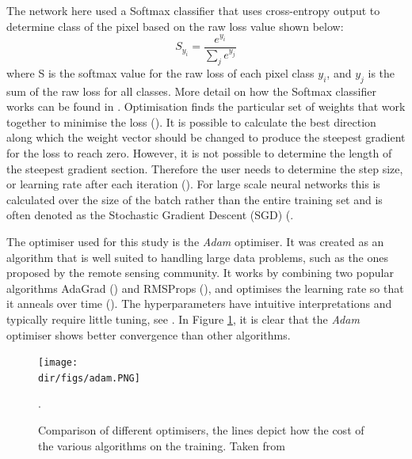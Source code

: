The network here used a Softmax classifier that uses cross-entropy output to determine class of the pixel based on the raw loss value shown below:
\[S_{y_i} = \frac{e^{y_i}}{\sum_j e^{y_j}}\]
where S is the softmax value for the raw loss of each pixel class $y_i$, and $y_j$ is the sum of the raw loss for all classes.
More detail on how the Softmax classifier works can be found in \citet{Richmond19b}. Optimisation finds the particular set of weights that work together to minimise the loss (\cite{Karpathy_opt}). It is possible to calculate the best direction along which the weight vector should be changed to produce the steepest gradient for the loss to reach zero. However, it is not possible to determine the length of the steepest gradient section. Therefore the user needs to determine the step size, or learning rate after each iteration (\cite{Karpathy_opt}). For large scale neural networks this is calculated over the size of the batch rather than the entire training set and is often denoted as the Stochastic Gradient Descent (SGD) (\cite{Bottou98,Sutskever13}.
\par 
The optimiser used for this study is the \textit{Adam} optimiser. It was created as an algorithm that is well suited to handling large data problems, such as the ones proposed by the remote sensing community. It works by combining two popular algorithms AdaGrad (\cite{duchi11}) and RMSProps (\cite{tielman12}), and optimises the learning rate so that it anneals over time (\cite{kingma14}). The hyperparameters have intuitive interpretations and typically require little tuning, see \citet{kingma14}. In Figure \ref{fig.adam}, it is clear that the \textit{Adam} optimiser shows better convergence than other algorithms.

\begin{figure}[htpb]
    \centering
    \texttt{[image: \\dir/figs/adam.PNG]}
    \caption[Comparison of different optimisers]{Comparison of different optimisers, the lines depict how the cost of the various algorithms on the training. Taken from \citet{kingma14}}.
    \label{fig.adam}
\end{figure}
